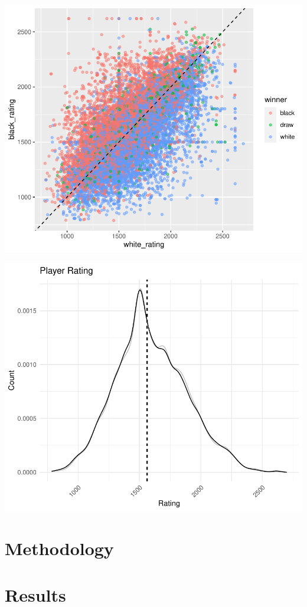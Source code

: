 \documentclass[11pt,preprint, authoryear]{elsarticle}
\numberwithin{equation}{section}
\numberwithin{figure}{section}
\numberwithin{table}{section}
\begin{document}
\includegraphics{WriteUp_files/figure-latex/Ratings-1.pdf}

\includegraphics{WriteUp_files/figure-latex/unnamed-chunk-2-1.pdf}

\hypertarget{methodology}{%
\section{Methodology}\label{methodology}}

\hypertarget{results}{%
\section{Results}\label{results}}
\end{document}
